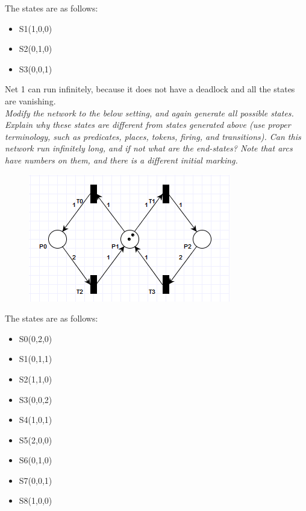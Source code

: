 \documentclass[letterpaper]{article}
\begin{document}
The states are as follows:
\begin{itemize}
 \item S1(1,0,0)
 \item S2(0,1,0)
 \item S3(0,0,1)
\end{itemize}

Net 1 can run infinitely, because it does not have a deadlock and all the states
are vanishing.\\

\textit{Modify the network to the below setting, and again generate all possible states. Explain why these states are different from states generated above (use proper terminology, such as predicates, places, tokens, firing, and transitions). Can this network run infinitely long, and if not what are the end-states?
 Note that arcs have numbers on them, and there is a different initial marking.
}

\begin{figure}[H]
 \centering
 \includegraphics[width=\textwidth]{image2.png}
\end{figure}

The states are as follows:
\begin{itemize}
 \item S0(0,2,0)
 \item S1(0,1,1)
 \item S2(1,1,0)
 \item S3(0,0,2)
 \item S4(1,0,1)
 \item S5(2,0,0)
 \item S6(0,1,0)
 \item S7(0,0,1)
 \item S8(1,0,0)
\end{itemize}
\end{document}
